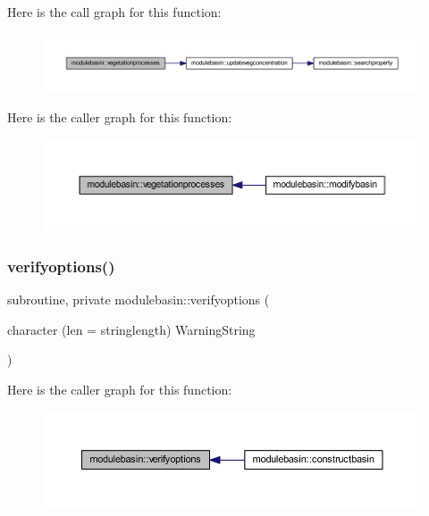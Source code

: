 Here is the call graph for this function\+:\nopagebreak
\begin{figure}[H]
\begin{center}
\leavevmode
\includegraphics[width=350pt]{namespacemodulebasin_a8345c242b1aed1c95c3779596054b89f_cgraph}
\end{center}
\end{figure}
Here is the caller graph for this function\+:\nopagebreak
\begin{figure}[H]
\begin{center}
\leavevmode
\includegraphics[width=350pt]{namespacemodulebasin_a8345c242b1aed1c95c3779596054b89f_icgraph}
\end{center}
\end{figure}
\mbox{\label{namespacemodulebasin_a6de1170114b38ad6db725fe89c8cd2bd}} 
\subsubsection{\texorpdfstring{verifyoptions()}{verifyoptions()}}
{\footnotesize\ttfamily subroutine, private modulebasin\+::verifyoptions (\begin{DoxyParamCaption}\item[{character (len = stringlength)}]{Warning\+String }\end{DoxyParamCaption})\hspace{0.3cm}{\ttfamily [private]}}

Here is the caller graph for this function\+:\nopagebreak
\begin{figure}[H]
\begin{center}
\leavevmode
\includegraphics[width=350pt]{namespacemodulebasin_a6de1170114b38ad6db725fe89c8cd2bd_icgraph}
\end{center}
\end{figure}
\mbox{\label{namespacemodulebasin_ab2ed3d304db416a0172609e73be05bd4}} 
